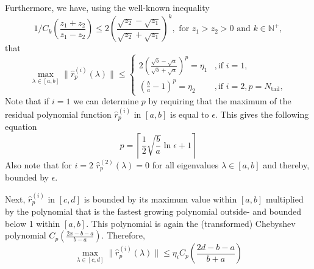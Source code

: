 Furthermore, we have, using the well-known inequality 
\begin{equation}
    1/C_{k}\left(\frac{z_1 + z_2}{z_1 - z_2}\right) \leq 2 \left(\frac{\sqrt{z_2} - \sqrt{z_1}}{\sqrt{z_2} + \sqrt{z_1}}\right)^k, \text{ for } z_1 > z_2 > 0 \text{ and } k \in \mathbb{N}^+,
    \label{eq:chebyshev_polynomial_bound}
\end{equation}
that
\begin{equation*}
    \max_{\lambda \in [a,b]} \|\hat{r}^{(i)}_p(\lambda)\| \leq
    \begin{cases}
        2\left(\frac{\sqrt{b}-\sqrt{a}}{\sqrt{b}+\sqrt{a}}\right)^p=\eta_1 &, \text{if } i = 1,\\
        \left(\frac{b}{a}-1\right)^p=\eta_2 &, \text{if } i = 2, p = N_{\text{tail}},
    \end{cases}
\end{equation*}
Note that if $i=1$ we can determine $p$ by requiring that the maximum of the residual polynomial function $\hat{r}^{(i)}_p$ in $[a,b]$ is equal to $\epsilon$. This gives the following equation
\begin{equation}
    p = \left\lceil\frac{1}{2}\sqrt{\frac{b}{a}}\ln{\epsilon} + 1\right\rceil
    \label{eq:chebyshev_degree_p}
\end{equation}
Also note that for $i=2$ $\hat{r}^{(2)}_p(\lambda) = 0$ for all eigenvalues $\lambda \in [a,b]$ and thereby, bounded by $\epsilon$.

Next, $\hat{r}^{(i)}_p$ in $[c,d]$ is bounded by its maximum value within $[a,b]$ multiplied by the polynomial that is the fastest growing polynomial outside- and bounded below 1 within $[a,b]$. This polynomial is again the (transformed) Chebyshev polynomial $C_{p}\left(\frac{2x - b - a}{b - a}\right)$. Therefore,
\begin{equation*}
    \max_{\lambda \in [c,d]} \|\hat{r}^{(i)}_p(\lambda)\| \leq \eta_i C_{p}\left(\frac{2d - b - a}{b + a}\right)
\end{equation*}

